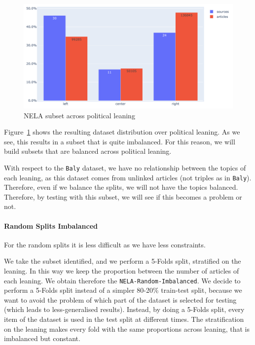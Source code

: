 \begin{figure}[!htbp]
    \centering
    \includegraphics[width=\linewidth]{figures/nela_subset_allsides_simplified.pdf}
    \caption{NELA subset across political leaning}
    \label{fig:nela_subset_allsides_simplified}
\end{figure}

Figure~\ref{fig:nela_subset_allsides_simplified} shows the resulting dataset distribution over political leaning. As we see, this results in a subset that is quite imbalanced. For this reason, we will build subsets that are balanced across political leaning.

With respect to the \texttt{Baly} dataset, we have no relationship between the topics of each leaning, as this dataset comes from unlinked articles (not triples as in \texttt{Baly}). Therefore, even if we balance the splits, we will not have the topics balanced.
Therefore, by testing with this subset, we will see if this becomes a problem or not.

\paragraph{Random Splits Imbalanced}

For the random splits it is less difficult as we have less constraints.

We take the subset identified, and we perform a 5-Folds split, stratified on the leaning. In this way we keep the proportion between the number of articles of each leaning. We obtain therefore the \texttt{NELA-Random-Imbalanced}.
We decide to perform a 5-Folds split instead of a simpler 80-20\% train-test split, because we want to avoid the problem of which part of the dataset is selected for testing (which leads to less-generalised results). Instead, by doing a 5-Folds split, every item of the dataset is used in the test split at different times.
The stratification on the leaning makes every fold with the same proportions across leaning, that is imbalanced but constant.

